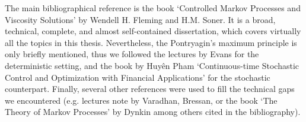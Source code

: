 \documentclass[12pt,a4paper,oneside]{book}
\numberwithin{theorem}{section}
\numberwithin{definition}{section}
\numberwithin{example}{section}
\numberwithin{exercise}{section}
\begin{document}
The main bibliographical reference is the book `Controlled Markov Processes and Viscosity Solutions' by Wendell H. Fleming and H.M. Soner\cite{fleming2006}. It is a broad, technical, complete, and almost self-contained dissertation, which covers virtually all the topics in this thesis. Nevertheless, the Pontryagin's maximum principle is only briefly mentioned, thus we followed the lectures by Evans\cite{evans2005} for the deterministic setting, and the book by Huyên Pham `Continuous-time Stochastic Control and Optimization with Financial Applications'\cite{pham2009} for the stochastic counterpart. Finally, several other references were used to fill the technical gaps we encountered (e.g. lectures note by Varadhan\cite{Varadhan}, Bressan\cite{bressan}, or the book `The Theory of Markov Processes' by Dynkin\cite{dynkin1961} among others cited in the bibliography).    




\newpage

\thispagestyle{empty}

{\hypersetup{linkbordercolor=black, hidelinks}
\tableofcontents
}
\end{document}
